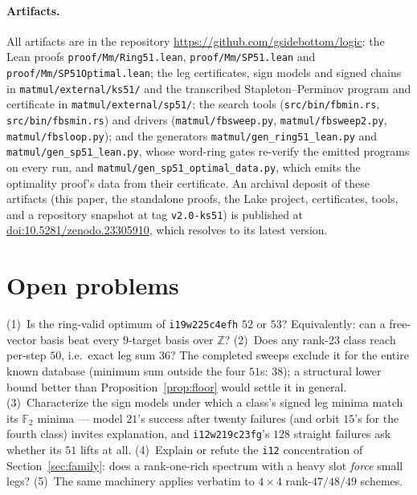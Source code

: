 \documentclass[11pt]{article}
\theoremstyle{definition}
\theoremstyle{remark}
\newcommand{\F}{\mathbb{F}}
\newcommand{\Z}{\mathbb{Z}}
\begin{document}
\begin{sloppypar}
\paragraph{Artifacts.}  All artifacts are in the repository
\url{https://github.com/gsidebottom/logic}: the Lean proofs
\texttt{proof/Mm/Ring51.lean}, \texttt{proof/Mm/SP51.lean} and
\texttt{proof/Mm/SP51Optimal.lean}; the leg
certificates, sign models and
signed chains in \texttt{matmul/external/ks51/} and the transcribed
Stapleton--Perminov program and certificate in
\texttt{matmul/external/sp51/}; the search tools
(\texttt{src/bin/fbmin.rs}, \texttt{src/bin/fbsmin.rs}) and drivers
(\texttt{matmul/fbsweep.py}, \texttt{matmul/fbsweep2.py},
\texttt{matmul/fbsloop.py}); and the
generators \texttt{matmul/gen\_ring51\_lean.py} and
\texttt{matmul/gen\_sp51\_lean.py}, whose word-ring gates
re-verify the emitted programs on every run, and
\texttt{matmul/gen\_sp51\_optimal\_data.py}, which emits the optimality
proof's data from their certificate.  An archival deposit of
these artifacts (this paper, the standalone proofs, the Lake project,
certificates, tools, and a repository snapshot at tag
\texttt{v2.0-ks51}) is published at
\href{https://doi.org/10.5281/zenodo.23305910}{doi:10.5281/zenodo.23305910},
which resolves to its latest version.
\end{sloppypar}

\section{Open problems}\label{sec:open}

(1)~Is the ring-valid optimum of \texttt{i19w225c4efh} $52$ or $53$?
Equivalently: can a free-vector basis beat every $9$-target basis over
$\Z$?  (2)~Does any rank-23 class reach per-step $50$, i.e.\ exact
leg sum $36$?  The completed sweeps exclude it for the entire known
database (minimum sum outside the four $51$s: $38$);
a structural lower bound better than Proposition~\ref{prop:floor}
would settle it in general.  (3)~Characterize the sign models under
which a class's signed leg minima match its $\F_2$ minima --- model
$21$'s success after twenty failures (and orbit $15$'s for the fourth
class) invites explanation, and \texttt{i12w219c23fg}'s $128$
straight failures ask whether its $51$ lifts at all.  (4)~Explain or
refute the \texttt{i12} concentration of Section~\ref{sec:family}:
does a rank-one-rich spectrum with a heavy slot \emph{force} small
legs?  (5)~The
same machinery applies verbatim to $4\times4$ rank-$47/48/49$ schemes.
\end{document}

